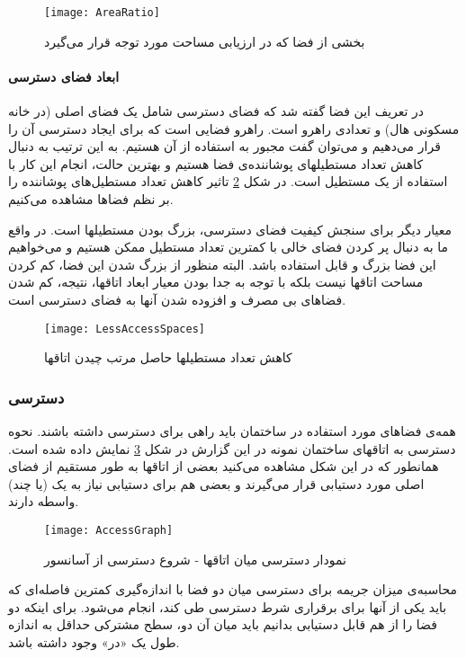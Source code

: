 \documentclass{report}
\begin{document}
\begin{figure} \centerline{\texttt{[image: AreaRatio]}} \caption{\label{fAreaRatio}
بخشی از فضا که در ارزیابی مساحت مورد توجه قرار می‌گیرد
 } \end{figure}

\paragraph{ابعاد فضای دسترسی}
در تعریف این فضا گفته شد که فضای دسترسی شامل یک فضای اصلی (در خانه مسکونی هال) و تعدادی راهرو است. راهرو فضایی است که برای ایجاد دسترسی آن را قرار می‌دهیم و می‌توان گفت مجبور به استفاده از آن هستیم. به این ترتیب به دنبال کاهش تعداد مستطیلهای پوشاننده‌ی فضا هستیم و بهترین حالت، انجام این کار با استفاده از یک مستطیل است. در شکل \ref{fLessAccessSpaces} تاثیر کاهش تعداد مستطیل‌های پوشاننده را بر نظم فضاها مشاهده می‌کنیم.

 معیار دیگر برای سنجش کیفیت فضای دسترسی، بزرگ بودن مستطیلها است. در واقع ما به دنبال پر کردن فضای خالی با کمترین تعداد مستطیل ممکن هستیم و می‌خواهیم این فضا بزرگ و قابل استفاده باشد. البته منظور از بزرگ شدن این فضا، کم کردن مساحت اتاقها نیست بلکه با توجه به جدا بودن معیار ابعاد اتاقها، نتیجه، کم شدن فضاهای بی مصرف و افزوده شدن آنها به فضای دسترسی است. 

\begin{figure} \centerline{\texttt{[image: LessAccessSpaces]}} \caption{\label{fLessAccessSpaces}
کاهش تعداد مستطیلها حاصل مرتب چیدن اتاقها
 } \end{figure}

\subsubsection{دسترسی}
همه‌ی فضاهای مورد استفاده در ساختمان باید راهی برای دسترسی داشته باشند. نحوه دسترسی به اتاقهای ساختمان نمونه در این گزارش در شکل \ref{fAccessGraph} نمایش داده شده است. همانطور که در این شکل مشاهده می‌کنید بعضی از اتاقها به طور مستقیم از فضای اصلی مورد دستیابی قرار می‌گیرند و بعضی هم برای دستیابی نیاز به یک (یا چند) واسطه دارند.

\begin{figure} \centerline{\texttt{[image: AccessGraph]}} \caption{\label{fAccessGraph}
نمودار دسترسی میان اتاقها - شروع دسترسی از آسانسور
 } \end{figure}

محاسبه‌ی میزان جریمه برای دسترسی میان دو فضا با اندازه‌گیری کمترین فاصله‌ای که باید یکی از آنها برای برقراری شرط دسترسی طی کند، انجام می‌شود. برای اینکه دو فضا را از هم قابل دستیابی بدانیم باید میان آن دو، سطح مشترکی حداقل به اندازه طول یک «در» وجود داشته باشد.
\end{document}

